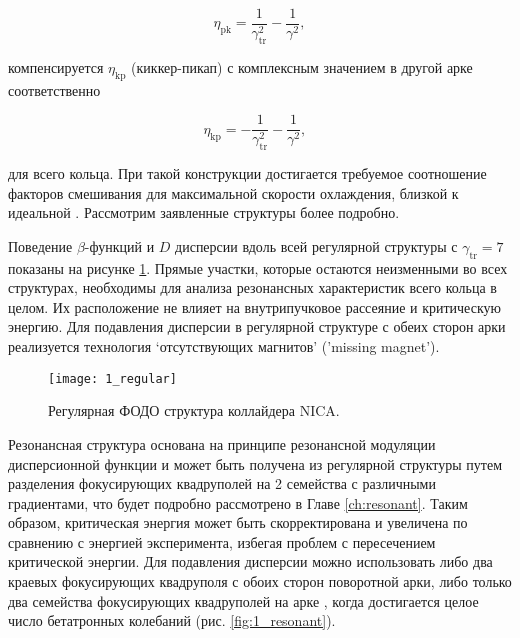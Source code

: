 \begin{equation} \label{eq:eta_pk}
\eta_{\textrm{pk}}=\frac{1}{\gamma_{\textrm{tr}}^2}-\frac{1}{\gamma^2},
\end{equation}

\noindent компенсируется $\eta_{\textrm{kp}}$ (киккер-пикап) с комплексным значением в другой арке соответственно

\begin{equation} \label{eq:eta_kp}
\eta_{\textrm{kp}}=-\frac{1}{\gamma_{\textrm{tr}}^2}-\frac{1}{\gamma^2},\ \ \ 
\end{equation}

\noindent для всего кольца. При такой конструкции достигается требуемое соотношение факторов смешивания для максимальной скорости охлаждения, близкой к идеальной \cite{senichev:hesr}. Рассмотрим заявленные структуры более подробно.

\par Поведение $\beta$-функций и $D$ дисперсии вдоль всей регулярной структуры с $\gamma_{\text{tr}}=7$ показаны на рисунке \ref{fig:1_regular}. Прямые участки, которые остаются неизменными во всех структурах, необходимы для анализа резонансных характеристик всего кольца в целом. Их расположение не влияет на внутрипучковое рассеяние и критическую энергию. Для подавления дисперсии в регулярной структуре с обеих сторон арки реализуется технология ‘отсутствующих магнитов’ ('missing magnet').

\begin{figure}[!h]
  \centering
   \texttt{[image: 1\_regular]}
   \caption{Регулярная ФОДО структура коллайдера NICA.}
   \label{fig:1_regular}
\end{figure}

\noindent Резонансная структура основана на принципе резонансной модуляции дисперсионной функции \cite{senichev:construction} и может быть получена из регулярной структуры путем разделения фокусирующих квадруполей на 2 семейства с различными градиентами, что будет подробно рассмотрено в Главе \ref{ch:resonant}. Таким образом, критическая энергия может быть скорректирована и увеличена по сравнению с энергией эксперимента, избегая проблем с пересечением критической энергии. Для подавления дисперсии можно использовать либо два краевых фокусирующих квадруполя с обоих сторон поворотной арки, либо только два семейства фокусирующих квадруполей на арке \cite{Kolokolchikov:2021trans}, когда достигается целое число бетатронных колебаний (рис. \ref{fig:1_resonant}).

